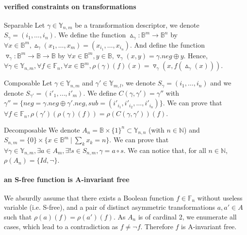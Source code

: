 \documentclass[a4paper,10pt]{article}
\newcommand{\N}{\mathbb{N}}%
\newcommand{\B}{\mathbb{B}}
\newcommand{\F}{\mathbb{F}}
\newcommand{\Y}{\mathbb{Y}}
\begin{document}
\paragraph{verified constraints on transformations}
\begin{compactitem}
\item[Separable]
Let $\gamma\in\Y_{n, m}$ be a transformation descriptor, we denote $S_{\gamma} = (i_1, \dots, i_n)$.
We define the function $\vartriangle_\gamma: \B^m \longrightarrow \B^n$ by $\forall x\in\B^m, \vartriangle_\gamma(x_1, \dots, x_m) = (x_{i_1}, \dots, x_{i_n})$.
And define the function $\triangledown_\gamma: \B^m \longrightarrow \B \longrightarrow \B$ by $\forall x\in\B^m, y\in\B, \triangledown_\gamma(x, y) = \gamma.neg \oplus y$.
Hence, $\forall \gamma\in\Y_{n, m},\forall f\in\F_n, \forall x\in\B^m, \rho(\gamma)(f)(x) = \triangledown_\gamma(x, f(\vartriangle_\gamma(x)))$.
\item[Composable]
Let $\gamma\in\Y_{n, m}$ and $\gamma'\in\Y_{m, l}$, we denote $S_{\gamma} = (i_1, \dots, i_n)$ and we denote $S_{\gamma'} = (i'_1, \dots, i'_m)$.
We define $C(\gamma, \gamma') = \gamma''$ with $\gamma'' = \{neg = \gamma.neg \oplus \gamma'.neg, sub = (i'_{i_1}, i'_{i_2}, \dots, i'_{i_n})\}$.
We can prove that $\forall f\in\F_n, \rho(\gamma')(\rho(\gamma)(f)) = \rho(C(\gamma, \gamma'))(f)$.
\item[Decomposable]
We denote $A_n = \B\times\{1\}^n \subset\Y_{n, n}$ (with $n\in\N$) and $S_{n, m} = \{0\}\times\{x\in\B^m~|~\sum_k x_k = n\}$.
We can prove that $\forall \gamma \in \Y_{n, m}, \exists a \in A_m, \exists! s \in S_{n, m}, \gamma = a \circ s$.
We can notice that, for all $n\in\N$, $\rho(A_n) = \{Id, \lnot\}$.
\end{compactitem}


\paragraph{an S-free function is A-invariant free\\}
We absurdly assume that there exists a Boolean function $f\in\F_n$ without useless variable (i.e. S-free), and a pair of distinct asymmetric transformations $a, a'\in A$ such that $\rho(a)(f) = \rho(a')(f)$.
As $A_n$ is of cardinal 2, we enumerate all cases, which lead to a contradiction as $f \neq \lnot f$.
Therefore $f$ is A-invariant free.
\end{document}
